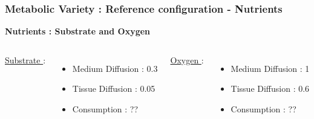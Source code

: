 \documentclass{beamer}
\begin{document}
\begin{frame}
\frametitle{Metabolic Variety : Reference configuration - Nutrients}
\textbf{Nutrients :  Substrate and Oxygen} 
\vspace{1 cm}
\begin{columns}
\column{60mm}
\underline{Substrate }:
\begin{itemize}
\item Medium Diffusion :  0.3
\item Tissue Diffusion : 0.05
\item Consumption :  ??
\end{itemize}
\column{60mm}
\underline{Oxygen }:
\begin{itemize}
\item Medium Diffusion :  1
\item Tissue Diffusion : 0.6
\item Consumption : ??
\end{itemize}
\end{columns}
\end{frame}
\end{document}
